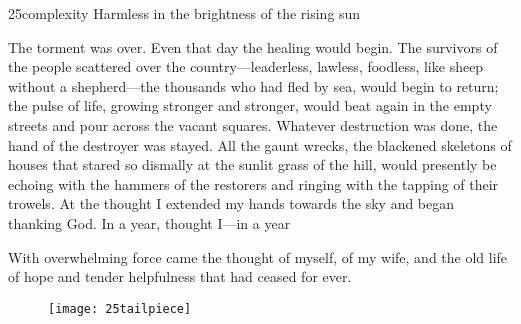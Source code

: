 \begin{bwbigpic}
	[1.2] 
	{25complexity} 
	{Harmless in the brightness of the rising sun} 
\end{bwbigpic}

The torment was over. Even that day the healing would begin. The survivors of the people scattered over the country—leaderless, lawless, foodless, like sheep without a shepherd—the thousands who had fled by sea, would begin to return; the pulse of life, growing stronger and stronger, would beat again in the empty streets and pour across the vacant squares. Whatever destruction was done, the hand of the destroyer was stayed. All the gaunt wrecks, the blackened skeletons of houses that stared so dismally at the sunlit grass of the hill, would presently be echoing with the hammers of the restorers and ringing with the tapping of their trowels. At the thought I extended my hands towards the sky and began thanking God. In a year, thought I—in a year\textellipsis

With overwhelming force came the thought of myself, of my wife, and the old life of hope and tender helpfulness that had ceased for ever.

\begin{figure}[b!]
\centering
\texttt{[image: 25tailpiece]}
\end{figure}